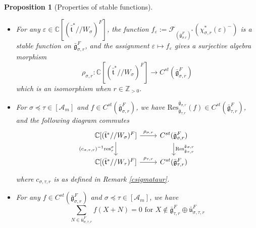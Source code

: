 \documentclass[11 pt]{article}
\numberwithin{equation}{subsection}
\newtheorem{proposition}[theorem]{Proposition}
\theoremstyle{definition}
\theoremstyle{remark}
\theoremstyle{conjecture}
\newcommand{\sA}{\mathscr A}
\newcommand{\bt}{\bar{\mathfrak t}}
\newcommand{\bg}{\bar{\mathfrak g}}
\newcommand{\bu}{\bar{\mathfrak u}}
\newcommand{\Res}{\mathrm{Res}}
\newcommand{\res}{\mathrm{res}}
\newcommand{\Z}{\mathbb Z}
\newcommand{\C}{\mathbb C}
\newcommand{\mcF}{\mathcal F}
\begin{document}
\begin{proposition}[Properties of stable functions]\label{stablefuncproperties}
    \begin{itemize}
        \item [(1)] For any $\varepsilon \in \C[(\bt^*//W_\sigma)^F]$, the function $ f_\varepsilon := \mcF_{(\bg_{\sigma.r}^F)^*}\left(\chi_{\sigma,r}^*(\varepsilon)^-\right)$
        is a stable function on $\bg_{\sigma,r}^F$, and the assignment $\varepsilon\mapsto f_\varepsilon$ gives a surjective algebra morphism
        \begin{equation*}
             \rho_{\sigma,r}:\C[ (\bt^*//W_\sigma)^F]\longrightarrow C^{st}(\bg_{\sigma,r}^F)
        \end{equation*}
   which is an isomorphism when $r \in \Z_{>0}$.

        \item[(2)] For $\sigma \preceq \tau  \in [\sA_m]$ and $f \in C^{st}(\bg_{\sigma,r}^F) $, we have $\Res^{\bg_{\sigma,r}}_{\bg_{\tau,r}}(f) \in C^{st}(\bg_{\tau,r}^F)$, and the following diagram commutes
        \begin{equation}\label{stableresdiag}
            \begin{tikzcd}
            \C[(\bt^*//W_\sigma)^F] \arrow{r}{\rho_{\sigma,r}} \arrow{d}[swap]{(c_{\sigma,\tau,r})^{-1}\res^{\sigma}_{\tau}} & C^{st}(\bg_{\sigma,r}^F) \arrow{d}{\Res^{\bg_{\sigma,r}}_{\bg_{\tau,r}}} \\
             \C[(\bt^*//W_\tau)^F] \arrow{r}{\rho_{\tau,r}} & C^{st}(\bg_{\tau,r}^F)
        \end{tikzcd}
        \end{equation}
        where $c_{\sigma,\tau,r}$ is as defined in Remark \ref{csigmataur}.
        \item[(3)] For any  $f \in C^{st}(\bg_{\sigma,r}^F) $ and $\sigma \preceq \tau  \in [\sA_m]$, we have 
        \begin{equation}\label{vanishingequation}
            \sum_{N\in \bu_{\sigma,\tau,r}^F}f(X+N)=0 \text{   for   } X \not \in \bg_{\tau,r}^F\oplus \bu_{\sigma,\tau,r}^F
        \end{equation}
    \end{itemize}
\end{proposition}
\end{document}
